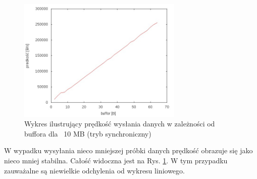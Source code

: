 \documentclass{BscUS}
\begin{document}
\begin{figure}[H]
{
\centering
\includegraphics[width=0.7\textwidth]{./img/S_10737420Send}
\caption{Wykres ilustrujący prędkość wysłania danych w zależności od buffora dla ~10 MB (tryb synchroniczny)}
\label{fig:S_10737420Send}
}
\end{figure}
\noindent W wypadku wysyłania nieco mniejszej próbki danych prędkość obrazuje się jako nieco mniej stabilna. Całość widoczna jest na Rys. \ref{fig:S_10737420Send}. W tym przypadku zauważalne są niewielkie odchylenia od wykresu liniowego.
\end{document}

